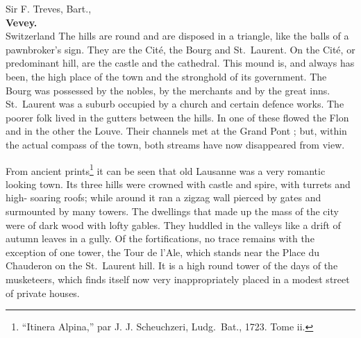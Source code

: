 \documentclass[10pt,english]{hletter}
\begin{document}
\begin{letter}{Sir F. Treves, Bart.,\\
               \textbf{Vevey.}\\
               Switzerland}
The hills are round and are disposed in a triangle, like the balls of a
pawnbroker's sign. They are the Cit\'{e}, the Bourg and St.~Laurent. On the
Cit\'{e}, or predominant hill, are the castle and the cathedral. This mound
is, and always has been, the high place of the town and the stronghold
of its government. The Bourg was possessed by the nobles, by the
merchants and by the great inns. St.~Laurent was a suburb occupied by a
church and certain defence works. The poorer folk lived in the gutters
between the hills. In one of these flowed the Flon and in the other the
Louve. Their channels met at the Grand Pont ; but, within the actual
compass of the town, both streams have now disappeared from view.

From ancient prints\footnote{``Itinera Alpina,'' par J. J. Scheuchzeri,
Ludg.~Bat., 1723. Tome ii.} it can be seen that old Lausanne was a very
romantic looking town. Its three hills were crowned with castle and
spire, with turrets and high- soaring roofs; while around it ran a
zigzag wall pierced by gates and surmounted by many towers. The
dwellings that made up the mass of the city were of dark wood with
lofty gables. They huddled in the valleys like a drift of autumn leaves
in a gully. Of the fortifications, no trace remains with the exception
of one tower, the Tour de l'Ale, which stands near the Place du
Chauderon on the St.~Laurent hill. It is a high round tower of the days
of the musketeers, which finds itself now very inappropriately placed
in a modest street of private houses.


\vspace{2cm}

\vfill

\end{letter}
\end{document}
